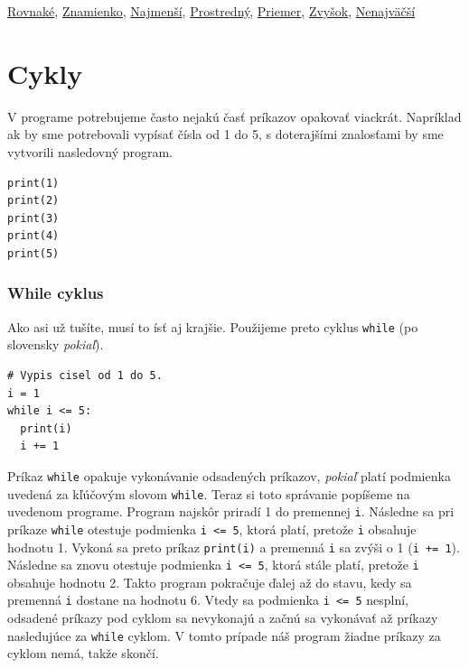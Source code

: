 \documentclass{article}
\begin{document}
\href{https://testovac.ksp.sk/tasks/ls-uvod-rovnake/}{Rovnaké},
\href{https://testovac.ksp.sk/tasks/ls-uvod-znamienko/}{Znamienko},
\href{https://testovac.ksp.sk/tasks/ls-uvod-najmensi/}{Najmenší},
\href{https://testovac.ksp.sk/tasks/ls-uvod-prostredny/}{Prostredný},
\href{https://testovac.ksp.sk/tasks/ls-uvod-priemer/}{Priemer},
\href{https://testovac.ksp.sk/tasks/ls-uvod-zvysok/}{Zvyšok},
\href{https://testovac.ksp.sk/tasks/ls-uvod-nenajvacsi/}{Nenajväčší}

\section{Cykly}
V programe potrebujeme často nejakú časť príkazov opakovať viackrát. Napríklad ak by sme potrebovali vypísať čísla od 1 do 5, s doterajšími znalosťami by sme vytvorili nasledovný program.
\begin{lstlisting}
print(1)
print(2)
print(3)
print(4)
print(5)
\end{lstlisting}

\subsubsection{While cyklus}
Ako asi už tušíte, musí to ísť aj krajšie. Použijeme preto cyklus \texttt{while} (po slovensky \textit{pokiaľ}).
\begin{lstlisting}
# Vypis cisel od 1 do 5.
i = 1
while i <= 5:
  print(i)
  i += 1
\end{lstlisting}


Príkaz \texttt{while} opakuje vykonávanie odsadených príkazov, \textit{pokiaľ} platí podmienka uvedená za kľúčovým slovom \texttt{while}. Teraz si toto správanie popíšeme na uvedenom programe. Program najskôr priradí 1 do premennej \texttt{i}. Následne sa pri príkaze \texttt{while} otestuje podmienka \texttt{i <= 5}, ktorá platí, pretože \texttt{i} obsahuje hodnotu 1. Vykoná sa preto príkaz \texttt{print(i)} a premenná \texttt{i} sa zvýši o 1 (\texttt{i += 1}). Následne sa znovu otestuje podmienka \texttt{i <= 5}, ktorá stále platí, pretože \texttt{i} obsahuje hodnotu 2. Takto program pokračuje ďalej až do stavu, kedy sa premenná \texttt{i} dostane na hodnotu 6. Vtedy sa podmienka \texttt{i <= 5} nesplní, odsadené príkazy pod cyklom sa nevykonajú a začnú sa vykonávať až príkazy nasledujúce za \texttt{while} cyklom. V tomto prípade náš program žiadne príkazy za cyklom nemá, takže skončí. 
\end{document}
